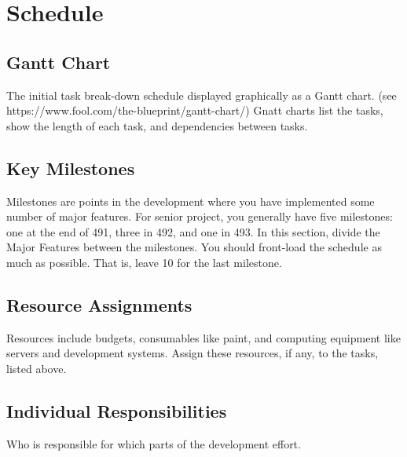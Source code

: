 \section{Schedule}

\subsection{Gantt Chart}
The initial task break-down schedule displayed graphically as a Gantt chart.
(see https://www.fool.com/the-blueprint/gantt-chart/)
Gnatt charts list the tasks, show the length of each task, and dependencies
between tasks.  

\subsection{Key Milestones}
Milestones are points in the development where you have implemented some
number of major features.  For senior project, you generally have five
milestones: one at the end of 491, three in 492, and one in 493.
In this section, divide the Major Features between the milestones.  You should
front-load the schedule as much as possible.  That is, leave 10%
for the last milestone.  

\subsection{Resource Assignments}
Resources include budgets, consumables like paint, and computing equipment
like servers and development systems.  Assign these resources, if any, to the
tasks, listed above. 

\subsection{Individual Responsibilities}
Who is responsible for which parts of the development effort.
